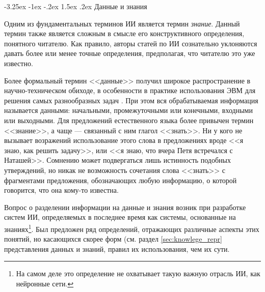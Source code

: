 \documentclass[12pt, openany, twoside]{book} %
\makeatletter
\renewcommand\section{\@startsection {section}{1}{\z@}%
                                   {-3.25ex \@plus -1ex \@minus -.2ex}%
                                   {1.5ex \@plus.2ex}%
                                   {\normalfont\large\bfseries}}
\makeatother
\begin{document}
\section{Данные и знания}

Одним из фундаментальных терминов ИИ является термин {\em знание}. Данный термин также является сложным в смысле его конструктивного определения, понятного читателю. Как правило, авторы статей по ИИ сознательно уклоняются давать более или менее точные определения, предполагая, что читателю это уже известно.

Более формальный термин <<данные>> получил широкое распространение в научно-техническом обиходе, в особенности в практике использования ЭВМ для решения самых разнообразных задач \cite{AIDictionary}. При этом вся обрабатываемая информация называется данными: началь\-ны\-ми, промежуточными или конечными, входными или выходными. Для предложений естественного языка более привычен термин <<знание>>, а чаще --- связанный с ним глагол <<знать>>. Ни у кого не вызывает возражений использование этого слова в предложениях вроде <<я знаю, как решить задачу>>, или <<я знаю, что вчера Петя встречался с Наташей>>. Сомнению может подвергаться лишь истинность подобных утверждений, но никак не возможность сочетания слова <<знать>> с фрагментами предложения, обозначающих любую информацию, о которой говорится, что она кому-то известна.

Вопрос о разделении информации на данные и знания возник при разработке систем ИИ, определяемых в последнее время как системы, основанные на знаниях\footnote{На самом деле это определение не охватывает такую важную отрасль ИИ, как нейронные сети.}. Был предложен ряд определений, отражающих различные аспекты этих понятий, но касающихся скорее форм (см. раздел \ref{sec:knowlege_repr} представления данных и знаний, правил их использования, чем их сути.
\end{document}
